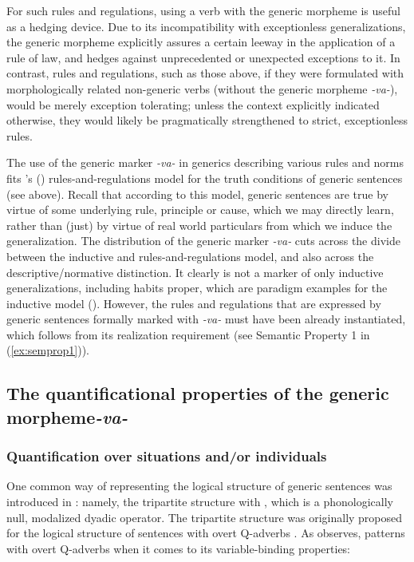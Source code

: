 \documentclass[output=paper,colorlinks,citecolor=brown]{langscibook}
\begin{document}
\noindent For such
rules and regulations, using a verb with the generic morpheme is useful as a hedging device.
Due to its incompatibility with exceptionless
generalizations, the generic morpheme explicitly
assures a certain leeway in the application of a rule of law, and hedges against unprecedented or unexpected exceptions to it.
In contrast, rules and regulations, such as those above, if they were formulated with morphologically related non-generic verbs (without the generic morpheme \textit{-va-}),
would be merely exception tolerating; unless the context explicitly indicated otherwise, they would
likely be
pragmatically strengthened to strict, exceptionless rules.

The use of the generic marker \textit{-va-} in
generics describing various rules and norms fits
\citeauthor{carlson1995truth}'s (\citeyear{carlson1995truth}) rules-and-regulations model for the truth conditions of generic sentences (see  above). Recall that according to this model, generic sentences are true by virtue of some underlying rule, principle or cause, which we may directly learn, rather than (just) by virtue of real world particulars from which we induce the generalization.
The distribution of the generic marker \textit{-va-} cuts across the
divide between the inductive and rules-and-regulations model, and also across the descriptive/normative distinction. It clearly is not a marker of only inductive generalizations, including habits proper, which are paradigm examples for the inductive model (\citealt{carlson1995truth}).
However, the rules and regulations that are expressed by generic sentences formally marked with \textit{-va-} must have been already instantiated, which follows from its realization
requirement (see Semantic Property 1 in (\ref{ex:semprop1})).


\subsection{The quantificational properties of the generic morpheme\textit{-va-}} \label{quantprop}

\subsubsection{Quantification over situations and/or individuals}\label{quantprop-sit-ind}


One common way of representing the logical structure of
generic sentences was introduced in :
namely, the tripartite structure with , which is a phonologically null, modalized dyadic operator.  The tripartite
structure was originally proposed for the logical structure of
sentences with overt Q-adverbs \citep{lewis1975}.
As \citet{chierchia1995} observes,  patterns with overt Q-adverbs when it comes to its variable-binding properties:
\end{document}
